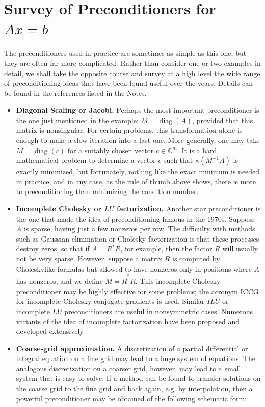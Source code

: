 \section{Survey of Preconditioners for $ Ax=b $} 
The preconditioners used in practice are sometimes as simple as this one, but they are often far more complicated. Rather than consider one or two examples in detail, we shall take the opposite course and survey at a high level the wide range of preconditioning ideas that have been found useful over the years. Details can be found in the references listed in the Notes.
\begin{itemize}
    \item \textbf{Diagonal Scaling or Jacobi.} Perhaps the most important preconditioner is the one just mentioned in the example: $M=\operatorname{diag}(A)$, provided that this matrix is nonsingular. For certain problems, this transformation alone is enough to make a slow iteration into a fast one. More generally, one may take $M=\operatorname{diag}(c)$ for a suitably chosen vector $c \in \mathbb{C}^m$. It is a hard mathematical problem to determine a vector $c$ such that $\kappa\left(M^{-1} A\right)$ is exactly minimized, but fortunately, nothing like the exact minimum is needed in practice, and in any case, as the rule of thumb above shows, there is more to preconditioning than minimizing the condition number.
    \item \textbf{Incomplete Cholesky or $L U$ factorization.} Another star preconditioner is the one that made the idea of preconditioning famous in the 1970s. Suppose $A$ is sparse, having just a few nonzeros per row. The difficulty with methods such as Gaussian elimination or Cholesky factorization is that these processes destroy zeros, so that if $A=R^* R$, for example, then the factor $R$ will usually not be very sparse. However, suppose a matrix $\tilde{R}$ is computed by Choleskylike formulas but allowed to have nonzeros only in positions where $A$ has nonzeros, and we define $M=\tilde{R}^* \tilde{R}$. This incomplete Cholesky preconditioner may be highly effective for some problems; the acronym ICCG for incomplete Cholesky conjugate gradients is used. Similar $I L U$ or incomplete $L U$ preconditioners are useful in nonsymmetric cases. Numerous variants of the idea of incomplete factorization have been proposed and developed extensively.
    \item \textbf{Coarse-grid approximation.} A discretization of a partial differential or integral equation on a fine grid may lead to a huge system of equations. The analogous discretization on a coarser grid, however, may lead to a small system that is easy to solve. If a method can be found to transfer solutions on the coarse grid to the fine grid and back again, e.g. by interpolation, then a powerful preconditioner may be obtained of the following schematic form:

\end{itemize}
